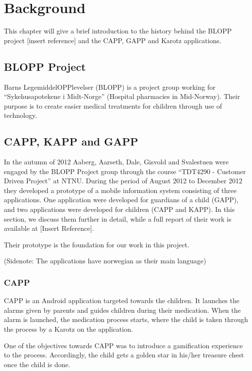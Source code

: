 \chapter{Background}
\label{chp:background}


This chapter will give a brief introduction to the history behind the BLOPP project [insert reference] and the CAPP, GAPP and Karotz applications.


\section{BLOPP Project}
\label{sec:bloppproject}
Barns LegemiddelOPPlevelser (BLOPP) is a project group working for ``Sykehusapotekene i Midt-Norge'' (Hospital pharmacies in Mid-Norway). Their purpose is to create easier medical treatments for children through use of technology.   


\section{CAPP, KAPP and GAPP}
\label{sec:cappgappkapp}
In the autumn of 2012 Aaberg, Aarseth, Dale, Gisvold and Svalestuen were engaged by the BLOPP Project group through the course ``TDT4290 - Customer Driven Project'' \cite{customerdrivenntnu} at NTNU. During the period of August 2012 to December 2012 they developed a prototype of a mobile information system consisting of three applications. One application were developed for guardians of a child (GAPP), and two applications were developed for children (CAPP and KAPP). In this section, we discuss them further in detail, while a full report of their work is available at [Insert Reference].

Their prototype is the foundation for our work in this project.

(Sidenote: The applications have norwegian as their main language) %

\subsection{CAPP}
CAPP is an Android application targeted towards the children. It launches the alarms given by parents and guides children during their medication. When the alarm is launched, the medication process starts, where the child is taken through the process by a Karotz on the application. 


One of the objectives towards CAPP was to introduce a gamification experience to the process. Accordingly, the child gets a golden star in his/her treasure chest once the child is done.

